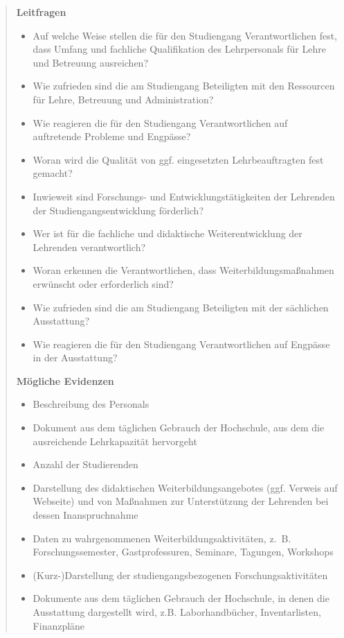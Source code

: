 \begin{quote}
\textbf{Leitfragen}

\begin{itemize}
\item
  Auf welche Weise stellen die für den Studiengang Verantwortlichen
  fest, dass Umfang und fachliche Qualifikation des Lehrpersonals für
  Lehre und Betreuung ausreichen?
\item
  Wie zufrieden sind die am Studiengang Beteiligten mit den Ressourcen
  für Lehre, Betreuung und Administration?
\item
  Wie reagieren die für den Studiengang Verantwortlichen auf auftretende
  Probleme und Engpässe?
\item
  Woran wird die Qualität von ggf. eingesetzten Lehrbeauftragten fest
  gemacht?
\item
  Inwieweit sind Forschungs- und Entwicklungstätigkeiten der Lehrenden
  der Studiengangsentwicklung förderlich?
\item
  Wer ist für die fachliche und didaktische Weiterentwicklung der
  Lehrenden verantwortlich?
\item
  Woran erkennen die Verantwortlichen, dass Weiterbildungsmaßnahmen
  erwünscht oder erforderlich sind?
\item
  Wie zufrieden sind die am Studiengang Beteiligten mit der sächlichen
  Ausstattung?
\item
  Wie reagieren die für den Studiengang Verantwortlichen auf Engpässe in
  der Ausstattung?
\end{itemize}

\textbf{Mögliche Evidenzen}

\begin{itemize}
\item
  Beschreibung des Personals
\item
  Dokument aus dem täglichen Gebrauch der Hochschule, aus dem die
  ausreichende Lehrkapazität hervorgeht
\item
  Anzahl der Studierenden
\item
  Darstellung des didaktischen Weiterbildungsangebotes (ggf. Verweis auf
  Webseite) und von Maßnahmen zur Unterstützung der Lehrenden bei dessen
  Inanspruchnahme
\item
  Daten zu wahrgenommenen Weiterbildungsaktivitäten, z.~B.
  Forschungssemester, Gastprofessuren, Seminare, Tagungen, Workshops
\item
  (Kurz-)Darstellung der studiengangsbezogenen Forschungsaktivitäten
\item
  Dokumente aus dem täglichen Gebrauch der Hochschule, in denen die
  Ausstattung dargestellt wird, z.B. Laborhandbücher, Inventarlisten,
  Finanzpläne
\end{itemize}
\end{quote}

